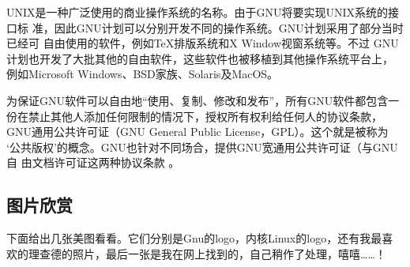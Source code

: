 UNIX是一种广泛使用的商业操作系统的名称。由于GNU将要实现UNIX系统的接口标
准，因此GNU计划可以分别开发不同的操作系统。GNU计划采用了部分当时已经可
自由使用的软件，例如\TeX\index{\TeX}排版系统和X Window视窗系统等。不过
GNU计划也开发了大批其他的自由软件，这些软件也被移植到其他操作系统平台上，
例如Microsoft Windows、BSD家族、Solaris及MacOS。

为保证GNU软件可以自由地“使用、复制、修改和发布”，所有GNU软件都包含一
份在禁止其他人添加任何限制的情况下，授权所有权利给任何人的协议条款，
GNU通用公共许可证（GNU General Public License，GPL）。这个就是被称为
‘公共版权’的概念。GNU也针对不同场合，提供GNU宽通用公共许可证（与GNU自
  由文档许可证这两种协议条款 \cite{Kline}。

\subsection{图片欣赏}
\label{subsec:picView}

下面给出几张美图看看。它们分别是Gnu的logo，内核Linux的logo，还有我最喜
欢的理查德的照片，最后一张是我在网上找到的，自己稍作了处理，嘻嘻……！

